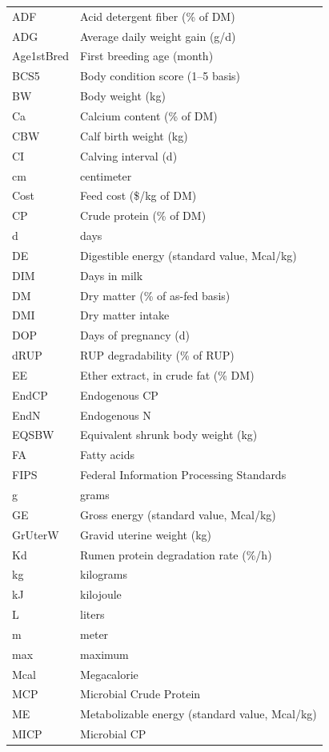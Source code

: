 \documentclass{article}
\begin{document}
\begin{refsection}
\begin{longtable}{@{} L{4cm} L{12cm} @{}}
ADF & Acid detergent fiber (\% of DM) \\
ADG & Average daily weight gain (g/d) \\
Age1stBred & First breeding age (month) \\
BCS5 & Body condition score (1–5 basis) \\
BW & Body weight (kg) \\
Ca & Calcium content (\% of DM) \\
CBW & Calf birth weight (kg) \\
CI & Calving interval (d) \\
cm & centimeter \\
Cost & Feed cost (\$/kg of DM) \\
CP & Crude protein (\% of DM) \\
d & days \\
DE & Digestible energy (standard value, Mcal/kg) \\
DIM & Days in milk \\
DM & Dry matter (\% of as-fed basis) \\
DMI & Dry matter intake \\
DOP & Days of pregnancy (d) \\
dRUP & RUP degradability (\% of RUP) \\
EE & Ether extract, in crude fat (\% DM) \\
EndCP & Endogenous CP \\
EndN & Endogenous N \\
EQSBW & Equivalent shrunk body weight (kg) \\
FA & Fatty acids \\
FIPS & Federal Information Processing Standards \\
g & grams \\
GE & Gross energy (standard value, Mcal/kg) \\
GrUterW & Gravid uterine weight (kg) \\
Kd & Rumen protein degradation rate (\%/h) \\
kg & kilograms \\
kJ & kilojoule \\
L & liters \\
m & meter \\
max & maximum \\
Mcal & Megacalorie \\
MCP & Microbial Crude Protein \\
ME & Metabolizable energy (standard value, Mcal/kg) \\
MICP & Microbial CP \\

\end{longtable}
\end{refsection}
\end{document}

